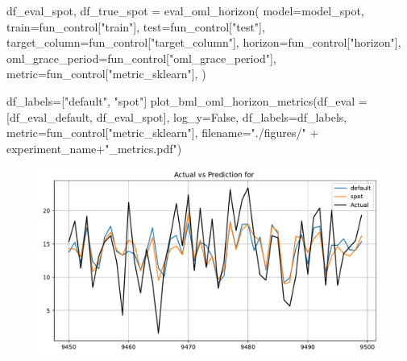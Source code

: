 \documentclass[
  letterpaper,
  DIV=11,
  numbers=noendperiod]{scrreprt}
\newenvironment{Shaded}{\begin{snugshade}}{\end{snugshade}}
\newcommand{\NormalTok}[1]{\textcolor[rgb]{0.00,0.23,0.31}{#1}}
\newcommand{\OperatorTok}[1]{\textcolor[rgb]{0.37,0.37,0.37}{#1}}
\newcommand{\StringTok}[1]{\textcolor[rgb]{0.13,0.47,0.30}{#1}}
\newcommand{\VariableTok}[1]{\textcolor[rgb]{0.07,0.07,0.07}{#1}}
\begin{document}
\begin{Shaded}
\begin{Highlighting}[]
\NormalTok{df\_eval\_spot, df\_true\_spot }\OperatorTok{=}\NormalTok{ eval\_oml\_horizon(}
\NormalTok{                    model}\OperatorTok{=}\NormalTok{model\_spot,}
\NormalTok{                    train}\OperatorTok{=}\NormalTok{fun\_control[}\StringTok{"train"}\NormalTok{],}
\NormalTok{                    test}\OperatorTok{=}\NormalTok{fun\_control[}\StringTok{"test"}\NormalTok{],}
\NormalTok{                    target\_column}\OperatorTok{=}\NormalTok{fun\_control[}\StringTok{"target\_column"}\NormalTok{],}
\NormalTok{                    horizon}\OperatorTok{=}\NormalTok{fun\_control[}\StringTok{"horizon"}\NormalTok{],}
\NormalTok{                    oml\_grace\_period}\OperatorTok{=}\NormalTok{fun\_control[}\StringTok{"oml\_grace\_period"}\NormalTok{],}
\NormalTok{                    metric}\OperatorTok{=}\NormalTok{fun\_control[}\StringTok{"metric\_sklearn"}\NormalTok{],}
\NormalTok{                )}
\end{Highlighting}
\end{Shaded}

\begin{Shaded}
\begin{Highlighting}[]
\NormalTok{df\_labels}\OperatorTok{=}\NormalTok{[}\StringTok{"default"}\NormalTok{, }\StringTok{"spot"}\NormalTok{]}
\NormalTok{plot\_bml\_oml\_horizon\_metrics(df\_eval }\OperatorTok{=}\NormalTok{ [df\_eval\_default, df\_eval\_spot], log\_y}\OperatorTok{=}\VariableTok{False}\NormalTok{, df\_labels}\OperatorTok{=}\NormalTok{df\_labels, metric}\OperatorTok{=}\NormalTok{fun\_control[}\StringTok{"metric\_sklearn"}\NormalTok{], filename}\OperatorTok{=}\StringTok{"./figures/"} \OperatorTok{+}\NormalTok{ experiment\_name}\OperatorTok{+}\StringTok{"\_metrics.pdf"}\NormalTok{)}
\end{Highlighting}
\end{Shaded}

\begin{figure}[H]

{\centering \includegraphics{025_spot_hpt_river_friedman_amfr_files/figure-pdf/cell-34-output-1.pdf}

}

\end{figure}
\end{document}
